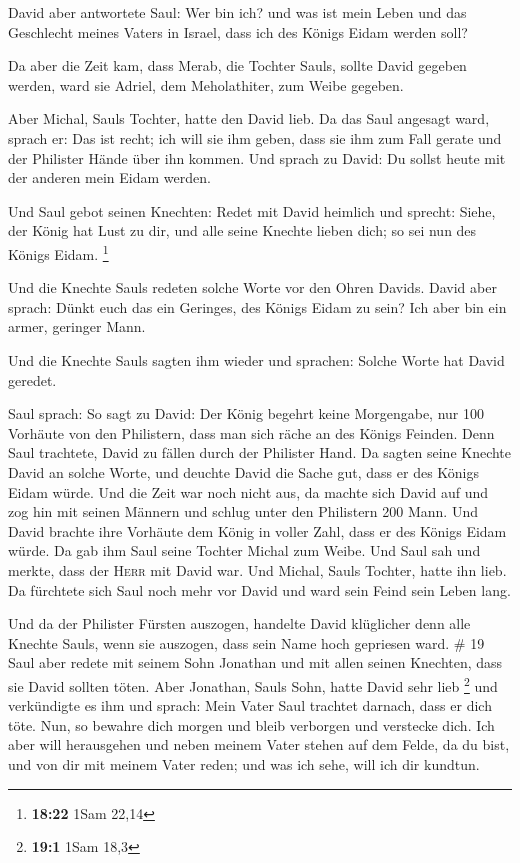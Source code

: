  David aber antwortete Saul: Wer bin ich? und was ist
mein Leben und das Geschlecht meines Vaters in Israel, dass ich des
Königs Eidam werden soll?

 Da aber die Zeit kam, dass Merab, die Tochter Sauls,
sollte David gegeben werden, ward sie Adriel, dem Meholathiter, zum
Weibe gegeben.

 Aber Michal, Sauls Tochter, hatte den David lieb. Da das
Saul angesagt ward, sprach er: Das ist recht;  ich will
sie ihm geben, dass sie ihm zum Fall gerate und der Philister Hände über
ihn kommen. Und sprach zu David: Du sollst heute mit der anderen mein
Eidam werden.

 Und Saul gebot seinen Knechten: Redet mit David heimlich
und sprecht: Siehe, der König hat Lust zu dir, und alle seine Knechte
lieben dich; so sei nun des Königs Eidam. \footnote{\textbf{18:22} 1Sam
  22,14}

 Und die Knechte Sauls redeten solche Worte vor den Ohren
Davids. David aber sprach: Dünkt euch das ein Geringes, des Königs Eidam
zu sein? Ich aber bin ein armer, geringer Mann.

 Und die Knechte Sauls sagten ihm wieder und sprachen:
Solche Worte hat David geredet.

 Saul sprach: So sagt zu David: Der König begehrt keine
Morgengabe, nur 100 Vorhäute von den Philistern, dass man sich räche an
des Königs Feinden. Denn Saul trachtete, David zu fällen durch der
Philister Hand.  Da sagten seine Knechte David an solche
Worte, und deuchte David die Sache gut, dass er des Königs Eidam würde.
Und die Zeit war noch nicht aus,  da machte sich David
auf und zog hin mit seinen Männern und schlug unter den Philistern 200
Mann. Und David brachte ihre Vorhäute dem König in voller Zahl, dass er
des Königs Eidam würde. Da gab ihm Saul seine Tochter Michal zum Weibe.
 Und Saul sah und merkte, dass der \textsc{Herr} mit
David war. Und Michal, Sauls Tochter, hatte ihn lieb.  Da
fürchtete sich Saul noch mehr vor David und ward sein Feind sein Leben
lang.

 Und da der Philister Fürsten auszogen, handelte David
klüglicher denn alle Knechte Sauls, wenn sie auszogen, dass sein Name
hoch gepriesen ward. \# 19  Saul aber redete mit seinem
Sohn Jonathan und mit allen seinen Knechten, dass sie David sollten
töten. Aber Jonathan, Sauls Sohn, hatte David sehr lieb \footnote{\textbf{19:1}
  1Sam 18,3}  und verkündigte es ihm und sprach: Mein
Vater Saul trachtet darnach, dass er dich töte. Nun, so bewahre dich
morgen und bleib verborgen und verstecke dich.  Ich aber
will herausgehen und neben meinem Vater stehen auf dem Felde, da du
bist, und von dir mit meinem Vater reden; und was ich sehe, will ich dir
kundtun.

